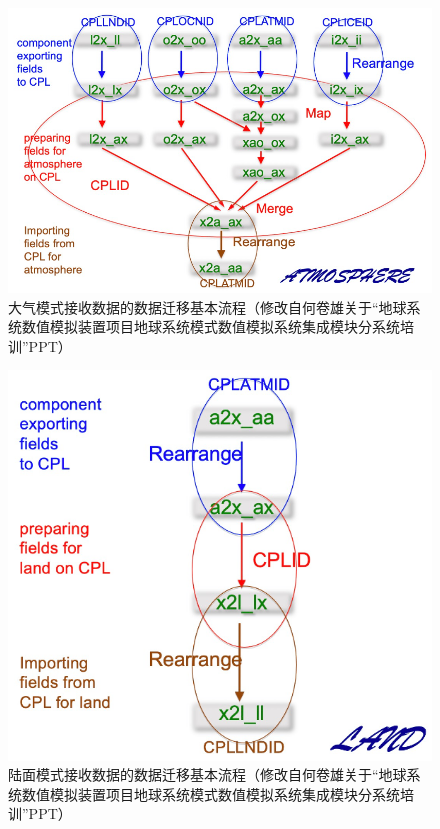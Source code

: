 {
\begin{figure}[htbp]
\centering
\includegraphics{Figures/模式构架/大气接收数据.png}
\caption[大气模式接收数据的数据迁移基本流程]{大气模式接收数据的数据迁移基本流程（修改自何卷雄关于“地球系统数值模拟装置项目地球系统模式数值模拟系统集成模块分系统培训”PPT）}
\label{fig:大气接收数据}
\end{figure}
}

{
\begin{figure}[htbp]
\centering
\includegraphics{Figures/模式构架/陆面接收数据.png}
\caption[陆面模式接收数据的数据迁移基本流程]{陆面模式接收数据的数据迁移基本流程（修改自何卷雄关于“地球系统数值模拟装置项目地球系统模式数值模拟系统集成模块分系统培训”PPT）}
\label{fig:陆面接收数据}
\end{figure}
}

